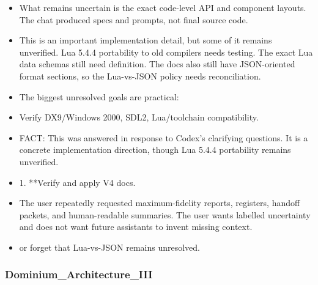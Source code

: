 \documentclass[11pt,a4paper]{report}
\begin{document}
\begin{itemize}
\item What remains uncertain is the exact code-level API and component layouts. The chat produced specs and prompts, not final source code.
\item This is an important implementation detail, but some of it remains unverified. Lua 5.4.4 portability to old compilers needs testing. The exact Lua data schemas still need definition. The docs also still have JSON-oriented format sections, so the Lua-vs-JSON policy needs reconciliation.
\item The biggest unresolved goals are practical:
\item Verify DX9/Windows 2000, SDL2, Lua/toolchain compatibility.
\item FACT: This was answered in response to Codex's clarifying questions. It is a concrete implementation direction, though Lua 5.4.4 portability remains unverified.
\item 1. **Verify and apply V4 docs.
\item The user repeatedly requested maximum-fidelity reports, registers, handoff packets, and human-readable summaries. The user wants labelled uncertainty and does not want future assistants to invent missing context.
\item or forget that Lua-vs-JSON remains unresolved.
\end{itemize}

\subsubsection{Dominium\_Architecture\_III}
\end{document}
